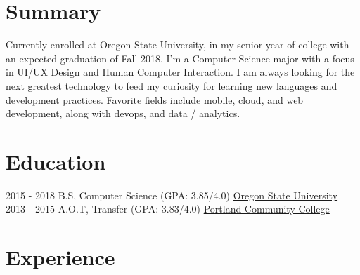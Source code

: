 \documentclass[letterpaper]{twentysecondcv} %
\begin{document}
\makeprofile %


\section{Summary}
    Currently enrolled at Oregon State University, in my senior year of college with an expected graduation of Fall 2018. I’m a Computer Science major with a focus in UI/UX Design and Human Computer Interaction.  I am always looking for the next greatest technology to feed my curiosity for learning new languages and development practices. Favorite fields include mobile, cloud, and web development, along with devops, and data / analytics. 
\vspace{2mm} 

\section{Education}

\begin{twenty} %
	\twentyitem
    	{2015 - 2018 }
        {}
        {  B.S, Computer Science \textnormal{(GPA: 3.85/4.0)}}
        {\href{http://www.oregonstate.edu/}{Oregon State University}}
        {}
        {}
	\twentyitem
    	{2013 - 2015}
		{}
        {  A.O.T, Transfer \textnormal{(GPA: 3.83/4.0)}}
        {\href{https://www.pcc.edu/}{Portland Community College}}
        {}
        {}
\end{twenty}


\section{Experience}
\end{document}
